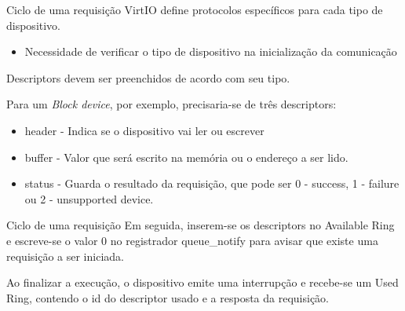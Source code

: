 \documentclass[brazil,nolapesd,aspectratio=169,noartschool]{lapesd-slides}
\begin{document}
\begin{frame}{Ciclo de uma requisição}
	VirtIO define protocolos específicos para cada tipo de dispositivo.
	\begin{itemize}
		\item Necessidade de verificar o tipo de dispositivo na inicialização da comunicação
	\end{itemize}

	\vspace{1em}
	
	Descriptors devem ser preenchidos de acordo com seu tipo.

	\vspace{1em}

	Para um \textit{Block device}, por exemplo, precisaria-se de três descriptors:
	\begin{itemize}
		\item header - Indica se o dispositivo vai ler ou escrever
		\item buffer - Valor que será escrito na memória ou o endereço a ser lido.
		\item status - Guarda o resultado da requisição, que pode ser 0 - success, 1 - failure ou 2 - unsupported device.
	\end{itemize}
\end{frame}

\begin{frame}{Ciclo de uma requisição}
	Em seguida, inserem-se os descriptors no Available Ring e escreve-se o valor 0 no registrador
	queue{\_}notify para avisar que existe uma requisição a	ser iniciada.

	\vspace{1em}

	Ao finalizar a execução, o dispositivo emite uma interrupção e recebe-se um Used Ring,
	contendo o id do descriptor usado e a resposta da requisição.

\end{frame}



\thanksframe

\nocite{RISCVUserISA}
\nocite{virtioPaper}
\nocite{virtioManual}
\nocite{MarzOS}
\end{document}
